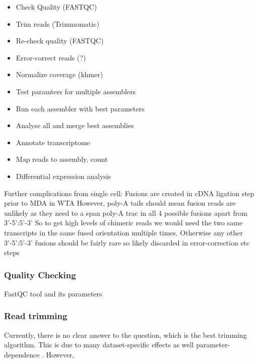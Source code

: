 \begin{itemize}
    \item Check Quality (FASTQC)
    \item Trim reads (Trimmomatic)
    \item Re-check quality (FASTQC)
    \item Error-correct reads (?)
    \item Normalize coverage (khmer)
    \item Test paramters for multiple assemblers
    \item Run each assembler with best parameters
    \item Analyse all and merge best assemblies
    \item Annotate transcriptome
    \item Map reads to assembly, count
    \item Differential expression analysis
\end{itemize}










Further complications from single cell:
Fusions are created in cDNA ligation step prior to MDA in WTA
However, poly-A tails should mean fusion reads are unlikely as they need to a
span poly-A trac in all 4 possible fusions apart from 3'-5':5'-3'
So to get high levels of chimeric reads we would need the two same transcripts
in the same fused orientation multiple times.  Otherwise any other 3'-5':5'-3'
fusions should be fairly rare so likely discarded in error-correction etc steps

\subsubsection{Quality Checking}

FastQC tool and its parameters

\subsubsection{Read trimming}



Currently, there is no clear answer to the question, which is the best trimming algorithm.
This is due to many dataset-specific effects as well parameter-dependence \citep{DelFabbro2013}.
However, 



